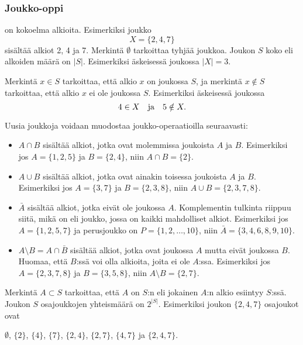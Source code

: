 \subsubsection{Joukko-oppi}


 on kokoelma alkioita.
Esimerkiksi joukko
\[X=\{2,4,7\}\]
sisältää alkiot 2, 4 ja 7.
Merkintä $\emptyset$ tarkoittaa tyhjää joukkoa.
Joukon $S$ koko eli alkoiden määrä on $|S|$.
Esimerkiksi äskeisessä joukossa $|X|=3$.

Merkintä $x \in S$ tarkoittaa,
että alkio $x$ on joukossa $S$,
ja merkintä $x \notin S$ tarkoittaa,
että alkio $x$ ei ole joukossa $S$.
Esimerkiksi äskeisessä joukossa
\[4 \in X \hspace{10px}\textrm{ja}\hspace{10px} 5 \notin X.\]

\begin{samepage}
Uusia joukkoja voidaan muodostaa joukko-operaatioilla
seuraavasti:
\begin{itemize}
\item {} $A \cap B$ sisältää alkiot,
jotka ovat molemmissa joukoista $A$ ja $B$.
Esimerkiksi jos $A=\{1,2,5\}$ ja $B=\{2,4\}$,
niin $A \cap B = \{2\}$.
\item {} $A \cup B$ sisältää alkiot,
jotka ovat ainakin toisessa joukoista $A$ ja $B$.
Esimerkiksi jos $A=\{3,7\}$ ja $B=\{2,3,8\}$,
niin $A \cup B = \{2,3,7,8\}$.
\item {} $\bar A$ sisältää alkiot,
jotka eivät ole joukossa $A$.
Komplementin tulkinta riippuu siitä, mikä on
 eli joukko, jossa on kaikki
mahdolliset alkiot. Esimerkiksi jos
$A=\{1,2,5,7\}$ ja perusjoukko on $P=\{1,2,\ldots,10\}$,
niin $\bar A = \{3,4,6,8,9,10\}$.
\item {} $A \setminus B = A \cap \bar B$ sisältää alkiot,
jotka ovat joukossa $A$ mutta eivät joukossa $B$.
Huomaa, että $B$:ssä voi olla alkioita,
joita ei ole $A$:ssa.
Esimerkiksi jos $A=\{2,3,7,8\}$ ja $B=\{3,5,8\}$,
niin $A \setminus B = \{2,7\}$.
\end{itemize}
\end{samepage}


Merkintä $A \subset S$ tarkoittaa,
että $A$ on $S$:n 
eli jokainen $A$:n alkio esiintyy $S$:ssä.
Joukon $S$ osajoukkojen yhteismäärä on $2^{|S|}$.
Esimerkiksi joukon $\{2,4,7\}$
osajoukot ovat
\begin{center}
$\emptyset$,
$\{2\}$, $\{4\}$, $\{7\}$, $\{2,4\}$, $\{2,7\}$, $\{4,7\}$ ja $\{2,4,7\}$.
\end{center}

